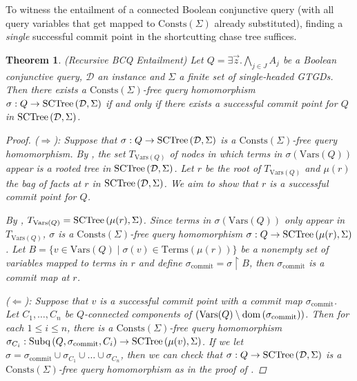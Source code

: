 \documentclass[12pt]{report}
\theoremstyle{plain}
\newtheorem{theorem}{Theorem}[chapter]
\theoremstyle{definition}
\def\Vars{{\mathrm{Vars}}}
\def\Consts{{\mathrm{Consts}}}
\def\Terms{{\mathrm{Terms}}}
\newcommand{\dom}[1]{\ensuremath{\normalfont{\operatorname{dom}} \left( #1 \right)}}
\newcommand{\SCTree}[2]{\ensuremath{\normalfont{\textrm{SCTree}} \left( #1, #2 \right)}}
\newcommand{\Subq}[3]{\ensuremath{\normalfont{\textrm{Subq}} \left( #1, #2, #3 \right)}}
\begin{document}
To witness the entailment of a connected Boolean conjunctive query (with all query variables that get mapped to $\Consts(\Sigma)$ already substituted), finding a \emph{single} successful commit point in the shortcutting chase tree suffices.

\begin{theorem}(Recursive BCQ Entailment)
\label{recursive-connected-bcq-entailment}
  Let $Q = \exists \vec{z}. \bigwedge_{j \in J} A_j$ be a Boolean conjunctive query, $\mathcal{D}$ an instance and $\Sigma$ a finite set of single-headed GTGDs. Then there exists a $\Consts(\Sigma)$-free query homomorphism $\sigma: Q \rightarrow \SCTree{\mathcal{D}}{\Sigma}$ if and only if there exists a successful commit point for $Q$ in $\SCTree{\mathcal{D}}{\Sigma}$.
  \begin{proof}
    ($\Longrightarrow$): Suppose that $\sigma: Q \rightarrow \SCTree{\mathcal{D}}{\Sigma}$ is a $\Consts(\Sigma)$-free query homomorphism. By , the set $T_{\Vars(Q)}$ of nodes in which terms in $\sigma(\Vars(Q))$ appear is a rooted tree in $\SCTree{\mathcal{D}}{\Sigma}$. Let $r$ be the root of $T_{\Vars(Q)}$ and $\mu(r)$ the bag of facts at $r$ in $\SCTree{\mathcal{D}}{\Sigma}$. We aim to show that $r$ is a successful commit point for $Q$.

    By , $T_{\Vars(Q)} = \SCTree{\mu(r)}{\Sigma}$. Since terms in $\sigma(\Vars(Q))$ only appear in $T_{\Vars(Q)}$, $\sigma$ is a $\Consts(\Sigma)$-free query homomorphism $\sigma: Q \rightarrow \SCTree{\mu(r)}{\Sigma}$. Let $B = \{ v \in \Vars(Q) \mid \sigma(v) \in \Terms(\mu(r)) \}$ be a nonempty set of variables mapped to terms in $r$ and define $\sigma_{\mathrm{commit}} = \sigma \upharpoonright B$, then $\sigma_{\mathrm{commit}}$ is a commit map at $r$.

    ($\Longleftarrow$): Suppose that $v$ is a successful commit point with a commit map $\sigma_{\mathrm{commit}}$. Let $C_1, \ldots, C_n$ be $Q$-connected components of $(\Vars(Q) \setminus \dom{\sigma_{\mathrm{commit}}})$. Then for each $1 \leq i \leq n$, there is a $\Consts(\Sigma)$-free query homomorphism $\sigma_{C_i}: \Subq{Q}{\sigma_{\mathrm{commit}}}{C_i} \rightarrow \SCTree{\mu(v)}{\Sigma}$. If we let $\sigma = \sigma_{\mathrm{commit}} \cup \sigma_{C_1} \cup \ldots \cup \sigma_{C_n}$, then we can check that $\sigma: Q \rightarrow \SCTree{\mathcal{D}}{\Sigma}$ is a $\Consts(\Sigma)$-free query homomorphism as in the proof of .
  \end{proof}
\end{theorem}
\end{document}
